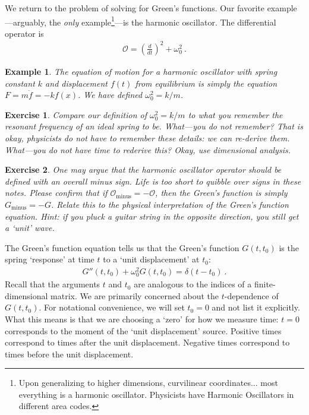 \documentclass[
  11pt,
	colorful,
	raggedright,
]{tufte-style-thesis-flip}
\newtheorem{exercise}{Exercise}[section]
\newtheorem{example}{Example}[section]
\begin{document}
We return to the problem of solving for Green's functions. Our favorite example---arguably, the \emph{only} example\footnote{Upon generalizing to higher dimensions, curvilinear coordinates... most everything is a harmonic oscillator. Physicists have Harmonic Oscillators in different area codes.}---is the harmonic oscillator. The differential operator is
\begin{align}
  \mathcal O = \left(\frac{d}{dt}\right)^2 + \omega_0^2 \ .
  \label{eq:O:HO}
\end{align}
\begin{example}
The equation of motion for a harmonic oscillator with spring constant $k$ and displacement $f(t)$ from equilibrium is simply the equation $F=m\ddot{f} = -k f(x)$. We have defined $\omega_0^2 = k/m$.
\end{example}
\begin{exercise}
Compare our definition of $\omega_0^2 = k/m$ to what you remember the resonant frequency of an ideal spring to be. What---you do not remember? That is okay, physicists do not have to remember these details: we can re-derive them. What---you do not have time to rederive this? Okay, use dimensional analysis. 
\end{exercise}
\begin{exercise}
One may argue that the harmonic oscillator operator should be defined with an overall minus sign. Life is too short to quibble over signs in these notes. Please confirm that if  $\mathcal O_\text{minus} = -\mathcal O$, then the Green's function is simply $G_\text{minus} = - G$. Relate this to the physical interpretation of the Green's function equation. {Hint:} if you pluck a guitar string in the opposite direction, you still get a `unit' wave.
\end{exercise}
The Green's function equation tells us that the Green's function $G(t,t_0)$ is the spring `response' at time $t$ to a `unit displacement' at $t_0$:
\begin{align}
  G''(t,t_0) + \omega_0^2 G(t,t_0) = \delta(t-t_0) \ .
  \label{eq:HO:Greens:eqn}
\end{align}
Recall that the arguments $t$ and $t_0$ are analogous to the indices of a finite-dimensional matrix. We are primarily concerned about the $t$-dependence of $G(t,t_0)$.  For notational convenience, we will set $t_0=0$ and not list it explicitly. What this means is that we are choosing a `zero' for how we measure time: $t=0$ corresponds to the moment of the `unit displacement' source. Positive times correspond to times after the unit displacement. Negative times correspond to times before the unit displacement.
\end{document}
